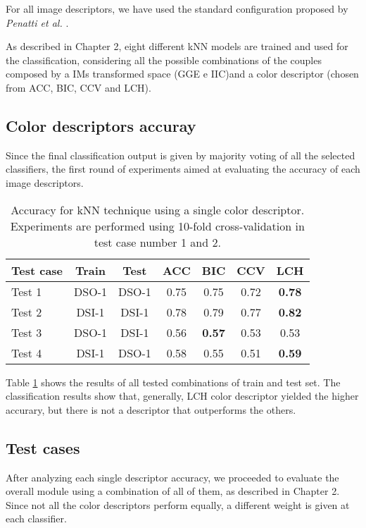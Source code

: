 For all image descriptors, we have used the standard configuration proposed by \emph{Penatti et al.} \cite{penatti2012comparative}.

As described in Chapter 2, eight different kNN models are trained and used for the classification, considering all the possible combinations of the couples composed by a IMs transformed space (GGE e IIC)and a color descriptor (chosen from ACC, BIC, CCV and LCH).

\subsection{Color descriptors accuray}

Since the final classification output is given by majority voting of all the selected classifiers, the first round of experiments aimed at evaluating the accuracy of each image descriptors.

\begin{table}[h!]
\centering
\begin{tabular}{l c c c c c c} 
\hline \hline 
\textbf{Test case} & \textbf{Train} & \textbf{Test} & \textbf{ACC} & \textbf{BIC} & \textbf{CCV} & \textbf{LCH} \\ [0.5ex]
\hline
Test 1 & DSO-1 & DSO-1 &	0.75 & 0.75	& 0.72 & \textbf{0.78}\\
Test 2 & DSI-1 & DSI-1 &	0.78 & 0.79 & 0.77 & \textbf{0.82}\\
Test 3 &	DSO-1 &	DSI-1 &	0.56 & \textbf{0.57} & 0.53 & 0.53\\
Test 4 &	DSI-1 & DSO-1 & 0.58 & 0.55 & 0.51 & \textbf{0.59}\\ [1ex]
\hline
\end{tabular}
\caption{Accuracy for kNN technique using a single color descriptor. Experiments are performed using 10-fold cross-validation in test case number 1 and 2.}
\label{table:colordescriptorperformance}
\end{table}

Table \ref{table:colordescriptorperformance} shows the results of all tested combinations of train and test set. The classification results show that, generally, LCH color descriptor yielded the higher accurary, but there is not a descriptor that outperforms the others.

\subsection{Test cases}

After analyzing each single descriptor accuracy, we proceeded to evaluate the overall module using a combination of all of them, as described in Chapter 2. Since not all the color descriptors perform equally, a different weight is given at each classifier.

